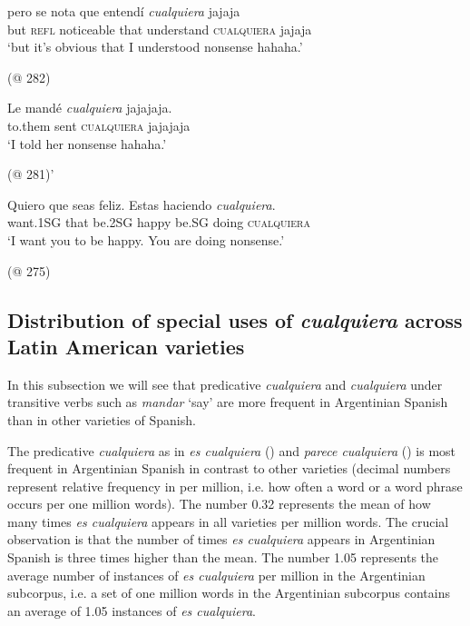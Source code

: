 \ea \label{ex:key:4-3}
    \gll pero se nota que entendí \textit{cualquiera} jajaja\\
    but \textsc{refl} noticeable that understand \textsc{cualquiera} jajaja\\
    \glt ‘but it's obvious that I understood nonsense hahaha.’ 
    
    (@ 282)
\z

\ea \label{ex:key:4-4}
    \gll Le mandé \textit{cualquiera} jajajaja.\\
    to.them sent \textsc{cualquiera} jajajaja \\
    \glt ‘I told her nonsense hahaha.’  
    
    (@ 281)’ 
\z


\ea \label{ex:key:4-5}
     \gll Quiero que seas feliz. Estas haciendo \textit{cualquiera}.\\
    want.\textsc{1SG} that be.\textsc{2SG} happy be.\textsc{SG} doing \textsc{cualquiera}\\
    \glt ‘I want you to be happy. You are doing nonsense.’ 
    
    (@ 275)  
\z


\subsection{{Distribution} {of} {special} {uses} {of} {\textit{cualquiera} }{across} {Latin} {American} {varieties}} \label{sec:4.3.1-2} %

In this subsection we will see that predicative \textit{cualquiera} and \textit{cualquiera} under transitive verbs such as \textit{mandar} ‘say’ are more frequent in Argentinian Spanish than in other varieties of Spanish.

The predicative \textit{cualquiera} as in \textit{es cualquiera} () and \textit{parece cualquiera} () is most frequent in Argentinian Spanish in contrast to other varieties (decimal numbers represent relative frequency in per million, i.e. how often a word or a word phrase occurs per one million words). The number 0.32 represents the mean of how many times \textit{es cualquiera} appears in all varieties per million words. The crucial observation is that the number of times \textit{es cualquiera} appears in Argentinian Spanish is three times higher than the mean. The number 1.05 represents the average number of instances of \textit{es cualquiera} per million in the Argentinian subcorpus, i.e. a set of one million words in the Argentinian subcorpus contains an average of 1.05 instances of \textit{es cualquiera}.


